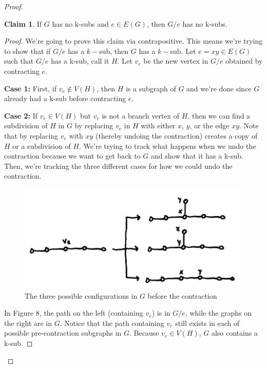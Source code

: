 \documentclass[12pt]{article}
\theoremstyle{definition}
\newtheorem{claim}{Claim}
\begin{document}
\begin{proof}
\begin{greenbox}
    \begin{claim}
        If $G$ has no k-subs and $e \in E(G)$, then $G / e$  has no k-subs.
    \end{claim}
\end{greenbox}

    \begin{proof}
        We're going to prove this claim via contrapositive. This means we're trying to show that if $G/e$ has a $k-$sub, then $G$ has a $k-$sub. Let $e = xy \in E(G)$ such that $G / e$ has a k-sub, call it $H$.
        Let $v_e$ be the new vertex in $G /e$ obtained by contracting $e$.

        \textbf{Case 1: }First, if $v_e \not \in V(H)$, then $H$ is a subgraph of $G$ and we're done since $G$ already had a k-sub before contracting $e$.

        \textbf{Case 2:} If $v_e \in V(H)$ but $v_e$ is not a branch vertex of $H$, then we can find a subdivision of $H$ in $G$ by replacing $v_e$ in $H$ with either $x$, $y$, or the edge $xy$. Note that by replacing $v_e$ with $xy$ (thereby undoing the contraction) creates a copy of $H$ or a subdivision of $H$. We're trying to track what happens when we undo the contraction because we want to get back to $G$ and show that it has a k-sub. Then, we're tracking the three different cases for how we could undo the contraction.
        \begin{figure}[hbt!]
            \centering
            \includegraphics[width=0.6\linewidth]{graphs/pre_contraction.png}
            \caption{The three possible configurations in $G$ before the contraction}
        \end{figure}

        In Figure $8$, the path on the left (containing $v_e$) is in $G/e$, while the graphs on the right are in $G$. Notice that the path containing $v_e$ still exists in each of possible pre-contraction subgraphs in $G$. Because $v_e \in V(H)$, $G$ also contains a k-sub.


\end{proof}
\end{proof}
\end{document}
